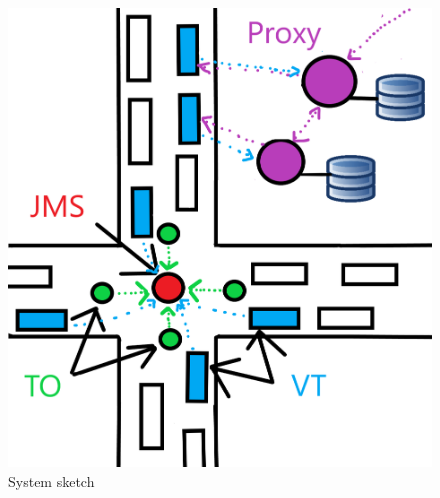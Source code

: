 \documentclass[17pt]{article}
\begin{document}
\begin{figure}[h!]
    \includegraphics[width=\textwidth]{Sketches/SchitaSistem.png}
    \caption{System sketch}
    \label{fig:System_sketch}
\end{figure}

\pagebreak
\end{document}
